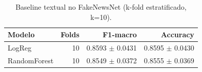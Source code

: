 \begin{table}[h]\centering
\caption{Baseline textual no FakeNewsNet (k-fold estratificado, k=10).}
\label{tab:baseline_textual_fnn}
\begin{tabular}{lrrr}
\toprule
Modelo & Folds & F1-macro & Accuracy \\
\midrule
LogReg & 10 & 0.8593 $\pm$ 0.0431 & 0.8595 $\pm$ 0.0430 \\
RandomForest & 10 & 0.8549 $\pm$ 0.0372 & 0.8555 $\pm$ 0.0369 \\
\bottomrule
\end{tabular}
\end{table}